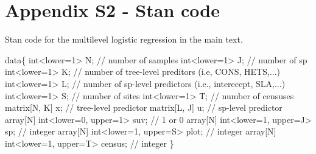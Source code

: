 \documentclass[
  12pt,
  letterpaper,
  DIV=11,
  numbers=noendperiod]{scrartcl}
\newenvironment{Shaded}{\begin{snugshade}}{\end{snugshade}}
\newcommand{\CommentTok}[1]{\textcolor[rgb]{0.37,0.37,0.37}{#1}}
\newcommand{\DataTypeTok}[1]{\textcolor[rgb]{0.68,0.00,0.00}{#1}}
\newcommand{\DecValTok}[1]{\textcolor[rgb]{0.68,0.00,0.00}{#1}}
\newcommand{\KeywordTok}[1]{\textcolor[rgb]{0.00,0.23,0.31}{#1}}
\newcommand{\NormalTok}[1]{\textcolor[rgb]{0.00,0.23,0.31}{#1}}
\begin{document}
\hypertarget{appendix-s2---stan-code}{%
\section{Appendix S2 - Stan code}\label{appendix-s2---stan-code}}

Stan code for the multilevel logistic regression in the main text.

\begin{Shaded}
\begin{Highlighting}[]
\KeywordTok{data}\NormalTok{\{}
  \DataTypeTok{int}\NormalTok{\textless{}}\KeywordTok{lower}\NormalTok{=}\DecValTok{1}\NormalTok{\textgreater{} N; }\CommentTok{// number of samples}
  \DataTypeTok{int}\NormalTok{\textless{}}\KeywordTok{lower}\NormalTok{=}\DecValTok{1}\NormalTok{\textgreater{} J; }\CommentTok{// number of sp}
  \DataTypeTok{int}\NormalTok{\textless{}}\KeywordTok{lower}\NormalTok{=}\DecValTok{1}\NormalTok{\textgreater{} K; }\CommentTok{// number of tree{-}level preditors (i.e, CONS, HETS,...)}
  \DataTypeTok{int}\NormalTok{\textless{}}\KeywordTok{lower}\NormalTok{=}\DecValTok{1}\NormalTok{\textgreater{} L; }\CommentTok{// number of sp{-}level predictors (i.e., interecept, SLA,...)}
  \DataTypeTok{int}\NormalTok{\textless{}}\KeywordTok{lower}\NormalTok{=}\DecValTok{1}\NormalTok{\textgreater{} S; }\CommentTok{// number of sites}
  \DataTypeTok{int}\NormalTok{\textless{}}\KeywordTok{lower}\NormalTok{=}\DecValTok{1}\NormalTok{\textgreater{} T; }\CommentTok{// number of censuses}
  \DataTypeTok{matrix}\NormalTok{[N, K] x; }\CommentTok{// tree{-}level predictor}
  \DataTypeTok{matrix}\NormalTok{[L, J] u; }\CommentTok{// sp{-}level predictor}
  \DataTypeTok{array}\NormalTok{[N] }\DataTypeTok{int}\NormalTok{\textless{}}\KeywordTok{lower}\NormalTok{=}\DecValTok{0}\NormalTok{, }\KeywordTok{upper}\NormalTok{=}\DecValTok{1}\NormalTok{\textgreater{} suv; }\CommentTok{// 1 or 0}
  \DataTypeTok{array}\NormalTok{[N] }\DataTypeTok{int}\NormalTok{\textless{}}\KeywordTok{lower}\NormalTok{=}\DecValTok{1}\NormalTok{, }\KeywordTok{upper}\NormalTok{=J\textgreater{} sp; }\CommentTok{// integer}
  \DataTypeTok{array}\NormalTok{[N] }\DataTypeTok{int}\NormalTok{\textless{}}\KeywordTok{lower}\NormalTok{=}\DecValTok{1}\NormalTok{, }\KeywordTok{upper}\NormalTok{=S\textgreater{} plot; }\CommentTok{// integer}
  \DataTypeTok{array}\NormalTok{[N] }\DataTypeTok{int}\NormalTok{\textless{}}\KeywordTok{lower}\NormalTok{=}\DecValTok{1}\NormalTok{, }\KeywordTok{upper}\NormalTok{=T\textgreater{} census; }\CommentTok{// integer}
\NormalTok{\}}


\end{Highlighting}
\end{Shaded}
\end{document}
